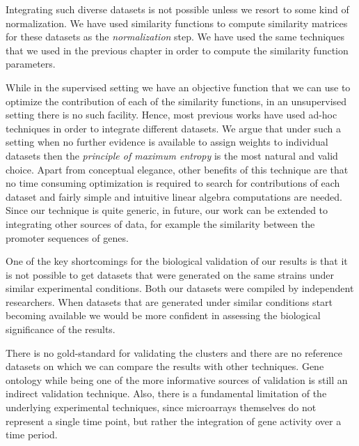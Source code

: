 Integrating such diverse datasets is not possible unless we resort to some kind of normalization. We have used similarity functions 
to compute similarity matrices for these datasets as the \textit{normalization} step. We have used the same techniques that we used 
in the previous chapter in order to compute the similarity function parameters.
 
While in the supervised setting we have an objective function that we can use to optimize the contribution of each of 
the similarity functions, in an unsupervised setting there is no such facility. Hence, most previous works have 
used ad-hoc techniques in order to integrate different datasets. We argue that under such a setting when no further 
evidence is available to assign weights to individual datasets then the \textit{principle of maximum entropy} 
is the most natural and valid choice. Apart from conceptual elegance, other benefits of this technique are 
that no time consuming optimization is required to search for contributions of each dataset and fairly simple and 
intuitive linear algebra computations are needed. Since our technique is quite generic, in future, our work 
can be extended to integrating other sources of data, for example  the similarity between the promoter sequences of genes.  

One of the key shortcomings for the biological validation of our results is that it is not possible to get datasets 
that were generated on the same strains under similar experimental conditions. Both our datasets were compiled by 
independent researchers. When datasets that are generated under similar conditions start becoming available we 
would be more confident in assessing the biological significance of the results.

There is no gold-standard for validating the clusters and there are no reference datasets on which we can compare 
the results with other techniques. Gene ontology while being one of the more informative sources of validation is 
still an indirect validation technique. Also, there is a fundamental limitation of the underlying experimental 
techniques, since microarrays themselves do not represent a single time point, but rather the integration of 
gene activity over a time period. 